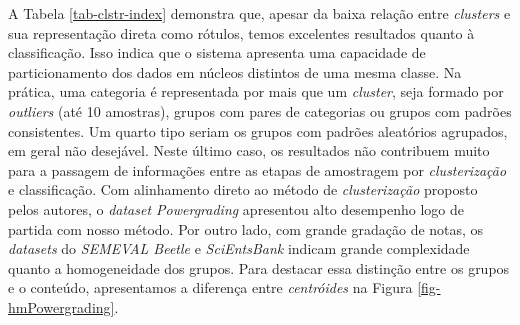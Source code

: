 A Tabela \ref{tab-clstr-index} demonstra que, apesar da baixa relação entre \textit{clusters} e sua representação direta como rótulos, temos excelentes resultados quanto à classificação. Isso indica que o sistema apresenta uma capacidade de particionamento dos dados em núcleos distintos de uma mesma classe. Na prática, uma categoria é representada por mais que um \textit{cluster}, seja formado por \textit{outliers} (até 10 amostras), grupos com pares de categorias ou grupos com padrões consistentes. Um quarto tipo seriam os grupos com padrões aleatórios agrupados, em geral não desejável. Neste último caso, os resultados não contribuem muito para a passagem de informações entre as etapas de amostragem por \textit{clusterização} e classificação. Com alinhamento direto ao método de \textit{clusterização} proposto pelos autores, o \textit{dataset Powergrading} apresentou alto desempenho logo de partida com nosso método. Por outro lado, com grande gradação de notas, os \textit{datasets} do \textit{SEMEVAL Beetle} e \textit{SciEntsBank} indicam grande complexidade quanto a homogeneidade dos grupos. Para destacar essa distinção entre os grupos e o conteúdo, apresentamos a diferença entre \textit{centróides} na Figura \ref{fig-hmPowergrading}.



